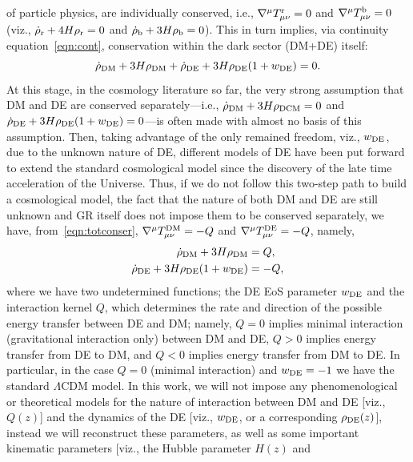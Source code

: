 \documentclass[twocolumn,a4paper,reprint,amssymb,aps,prd,groupedaddress,superscriptaddress,nofootinbib]{revtex4-2}
\begin{document}
of particle physics, are individually conserved, i.e., $\nabla^{\mu}T_{\mu\nu}^{\rm r}=0$ and
$\nabla^{\mu}T_{\mu\nu}^{\rm b}=0$ (viz., $\dot{\rho}_{\rm r}+4H\rho_{\rm r}=0$ and $\dot{\rho}_{\rm b}
+3H\rho_{\rm b}=0$). This in turn implies, via continuity equation~\cref{eqn:cont}, conservation within the
dark sector (DM+DE) itself:
%
\begin{equation}
\label{eqn:totconser}
    \dot{\rho}_{\rm DM} +3H\rho_{\rm DM}+\dot{\rho}_{\rm DE}+3H\rho_{\rm DE}(1+w_{\rm DE})=0.
\end{equation}
%
At this stage, in the cosmology literature so far, the very strong assumption that DM and DE are conserved
separately---i.e., $\dot{\rho}_{\rm DM} +3H\rho_{\rm DCM}=0$ and $\dot{\rho}_{\rm DE}+3H\rho_{\rm DE}(1
+w_{\rm DE})=0$---is often made with almost no basis of this assumption. Then, taking advantage of the only
remained freedom, viz., $w_{\rm DE}$, due to the unknown nature of DE, different models of DE have been put
forward to extend the standard cosmological model since the discovery of the late
time acceleration of the Universe. Thus, if we do not follow this two-step path to build a cosmological model,
the fact that the nature of both DM and DE are still unknown and GR itself does not impose them to be
conserved separately, we have, from~\cref{eqn:totconser}, $\nabla^{\mu}T_{\mu\nu}^{\rm DM}=-Q$ and
$\nabla^{\mu}T_{\mu\nu}^{\rm DE}=-Q$, namely,
%
\begin{align}
    \dot{\rho}_{\rm DM} +3H\rho_{\rm DM}&=Q, \label{eq:cont_eq_dm}\\
    \dot{\rho}_{\rm DE} +3H\rho_{\rm DE}(1+w_{\rm DE})&=-Q,\label{eq:cont_eq_de}
\end{align}
%
where we have two undetermined functions; the DE EoS parameter $w_{\rm DE}$ and the interaction kernel $Q$,
which determines the rate and direction of the possible energy transfer between DE and DM; namely, $Q = 0$
implies minimal interaction (gravitational interaction only) between DM and DE, $Q>0$ implies energy transfer
from DE to DM, and $Q<0$ implies energy transfer from DM to DE. In particular, in the case $Q = 0$ (minimal
interaction) and $w_{\rm DE} = -1$ we have the standard  $\Lambda$CDM model. In this work, we will not impose
any phenomenological or theoretical models for the nature of interaction between DM and DE [viz., $Q(z)$] and
the dynamics of the DE [viz., $w_{\rm DE}$, or a corresponding $\rho_{\rm DE}(z)$], instead we will reconstruct
these parameters, as well as some important kinematic parameters [viz., the Hubble parameter $H(z)$ and
\end{document}
